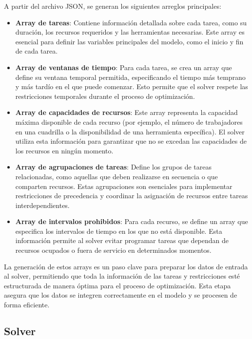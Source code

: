 \documentclass{article}
\begin{document}
A partir del archivo JSON, se generan los siguientes arreglos principales:

\begin{itemize}
    \item \textbf{Array de tareas}: Contiene información detallada sobre cada tarea, como su duración, los recursos requeridos y las herramientas necesarias. Este array es esencial para definir las variables principales del modelo, como el inicio y fin de cada tarea.

    \item \textbf{Array de ventanas de tiempo}: Para cada tarea, se crea un array que define su ventana temporal permitida, especificando el tiempo más temprano y más tardío en el que puede comenzar. Esto permite que el solver respete las restricciones temporales durante el proceso de optimización.

    \item \textbf{Array de capacidades de recursos}: Este array representa la capacidad máxima disponible de cada recurso (por ejemplo, el número de trabajadores en una cuadrilla o la disponibilidad de una herramienta específica). El solver utiliza esta información para garantizar que no se excedan las capacidades de los recursos en ningún momento.

    \item \textbf{Array de agrupaciones de tareas}: Define los grupos de tareas relacionadas, como aquellas que deben realizarse en secuencia o que comparten recursos. Estas agrupaciones son esenciales para implementar restricciones de precedencia y coordinar la asignación de recursos entre tareas interdependientes.

    \item \textbf{Array de intervalos prohibidos}: Para cada recurso, se define un array que especifica los intervalos de tiempo en los que no está disponible. Esta información permite al solver evitar programar tareas que dependan de recursos ocupados o fuera de servicio en determinados momentos.
\end{itemize}

La generación de estos arrays es un paso clave para preparar los datos de entrada al solver, permitiendo que toda la información de las tareas y restricciones esté estructurada de manera óptima para el proceso de optimización. Esta etapa asegura que los datos se integren correctamente en el modelo y se procesen de forma eficiente.


\subsection{Solver}
\end{document}
